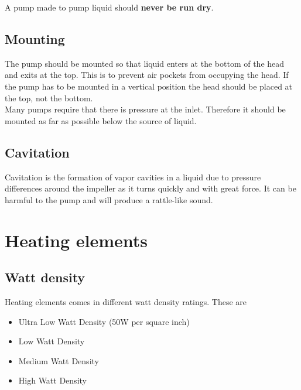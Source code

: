 \documentclass[11pt,fleqn,openany]{book} %
\begin{document}
A pump made to pump liquid should \textbf{never be run dry}.

\section{Mounting}

The pump should be mounted so that liquid enters at the bottom of the head and exits at the top. This is to prevent air pockets from occupying the head. If the pump has to be mounted in a vertical position the head should be placed at the top, not the bottom.\\

Many pumps require that there is pressure at the inlet. Therefore it should be mounted as far as possible below the source of liquid.

\section{Cavitation}

Cavitation is the formation of vapor cavities in a liquid due to pressure differences around the impeller as it turns quickly and with great force. It can be harmful to the pump and will produce a rattle-like sound.



\chapter{Heating elements}

\section{Watt density}

Heating elements comes in different watt density ratings. These are

\begin{itemize}
\item Ultra Low Watt Density (50W per square inch)
\item Low Watt Density
\item Medium Watt Density
\item High Watt Density\\
\end{itemize}
\end{document}
